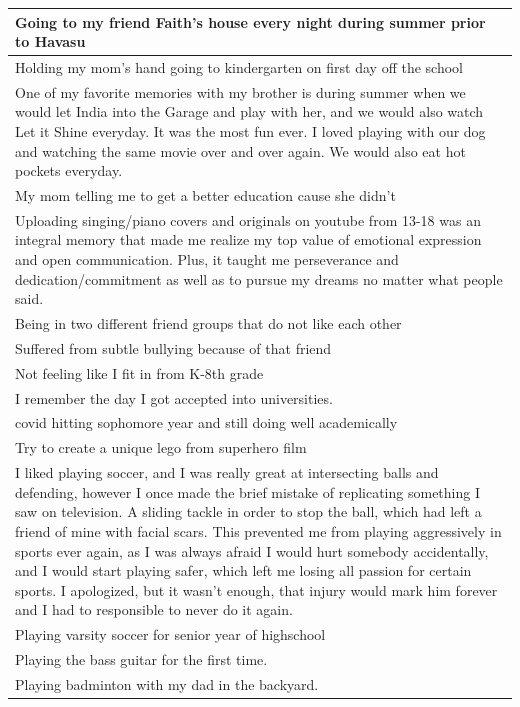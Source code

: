 \documentclass[
  .7em,
  letterpaper,
  DIV=11,
  numbers=noendperiod]{scrartcl}
\begin{document}
\begin{table}
\begin{tabular}{l}
\hline
Going to my friend Faith's house every night during summer prior to Havasu\\
\hline
Holding my mom’s hand going to kindergarten on first day off the school\\
\hline
One of my favorite memories with my brother is during summer when we would let India into the Garage and play with her, and we would also watch Let it Shine everyday. It was the most fun ever. I loved playing with our dog and watching the same movie over and over again. We would also eat hot pockets everyday.\\
\hline
My mom telling me to get a better education cause she didn't\\
\hline
Uploading singing/piano covers and originals on youtube from 13-18 was an integral memory that made me realize my top value of emotional expression and open communication. Plus, it taught me perseverance and dedication/commitment as well as to pursue my dreams no matter what people said.\\
\hline
Being in two different friend groups that do not like each other\\
\hline
Suffered from subtle bullying because of that friend\\
\hline
Not feeling like I fit in from K-8th grade\\
\hline
I remember the day I got accepted into universities.\\
\hline
covid hitting sophomore year and still doing well academically\\
\hline
Try to create a unique lego from superhero film\\
\hline
I liked playing soccer, and I was really great at intersecting balls and defending, however I once made the brief mistake of replicating something I saw on television. A sliding tackle in order to stop the ball, which had left a friend of mine with facial scars. This prevented me from playing aggressively in sports ever again, as I was always afraid I would hurt somebody accidentally, and I would start playing safer, which left me losing all passion for certain sports. I apologized, but it wasn't enough, that injury would mark him forever and I had to responsible to never do it again.\\
\hline
Playing varsity soccer for senior year of highschool\\
\hline
Playing the bass guitar for the first time.\\
\hline
Playing badminton with my dad in the backyard.\\

\end{tabular}
\end{table}
\end{document}
